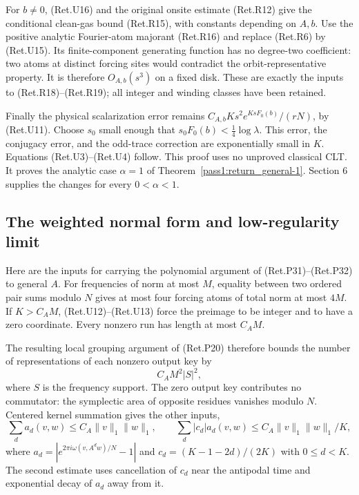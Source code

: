 For \(b\ne0\), (Ret.U16) and the original onsite estimate (Ret.R12) give
the conditional clean-gas bound (Ret.R15), with constants depending
on \(A,b\). Use the positive analytic Fourier-atom majorant (Ret.R16)
and replace (Ret.R6) by (Ret.U15). Its finite-component generating function
has no degree-two coefficient: two atoms at distinct forcing sites
would contradict the orbit-representative property. It is therefore
\(O_{A,b}(s^3)\) on a fixed disk. These are exactly the inputs to
(Ret.R18)--(Ret.R19); all integer and winding classes have been retained.

Finally the physical scalarization error remains
\(C_{A,b}Ks^2e^{KsF_0(b)}/(rN)\), by (Ret.U11).
Choose \(s_0\) small enough that \(s_0F_0(b)<\frac14\log\lambda\).
This error, the conjugacy error, and the odd-trace correction
are exponentially small in \(K\). Equations (Ret.U3)--(Ret.U4) follow.
This proof uses no unproved classical CLT.
It proves the analytic case \(\alpha=1\) of Theorem~\ref{pass1:return_general-1}.
Section 6 supplies the changes for every \(0<\alpha<1\).

\hypertarget{the-weighted-normal-form-and-low-regularity-limit}{%
\subsection{The weighted normal form and low-regularity limit}\label{the-weighted-normal-form-and-low-regularity-limit}}

Here are the inputs for carrying the polynomial argument of (Ret.P31)--(Ret.P32)
to general \(A\). For frequencies of norm at most \(M\), equality between
two ordered pair sums modulo \(N\) gives at most four forcing atoms
of total norm at most \(4M\). If \(K>C_A M\), (Ret.U12)--(Ret.U13) force
the preimage to be integer and to have a zero coordinate.
Every nonzero run has length at most \(C_A M\).

The resulting local grouping argument of (Ret.P20) therefore bounds
the number of representations of each nonzero output key by
\[
               C_A M^2 |S|^2,                           \tag{Ret.U17}
\]
where \(S\) is the frequency support. The zero output key contributes
no commutator: the symplectic area of opposite residues vanishes
modulo \(N\). Centered kernel summation gives the other inputs,
\[
 \sum_d a_d(v,w)\le C_A\|v\|_1\|w\|_1,\qquad
 \sum_d |c_d|a_d(v,w)\le
                    C_A\|v\|_1\|w\|_1/K,
\]
where \(a_d=|e^{2\pi i\omega(v,A^dw)/N}-1|\) and
\(c_d=(K-1-2d)/(2K)\) with \(0\le d<K\).
The second estimate uses cancellation of \(c_d\) near the antipodal
time and exponential decay of \(a_d\) away from it.

